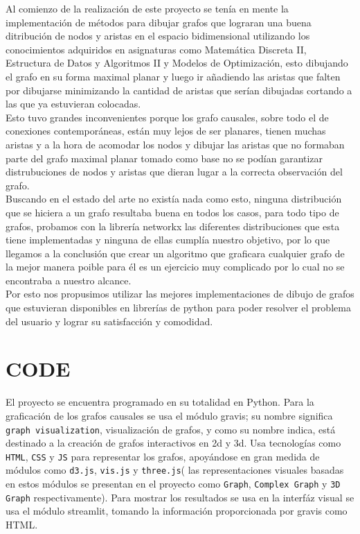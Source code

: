 \documentclass[a4paper,10pt,twocolumn]{article}
\begin{document}
Al comienzo de la realización de este proyecto se tenía en mente la implementación de métodos para dibujar grafos que lograran una buena ditribución de nodos y aristas en el espacio bidimensional utilizando los conocimientos adquiridos en asignaturas como Matemática Discreta II, Estructura de Datos y Algoritmos II y Modelos de Optimización, esto dibujando el grafo en su forma maximal planar y luego ir añadiendo las aristas que falten por dibujarse  minimizando la cantidad de aristas que serían dibujadas cortando a las que ya estuvieran colocadas. \\

Esto tuvo grandes inconvenientes porque los grafo causales, sobre todo el de conexiones contemporáneas, están muy lejos de ser planares, tienen muchas aristas y a la hora de acomodar los nodos y dibujar las aristas que no formaban parte del grafo maximal planar tomado como base no se podían garantizar distrubuciones de nodos y aristas que dieran lugar a la correcta observación del grafo.\\

Buscando en el estado del arte no existía nada como esto, ninguna distribución que se hiciera a un grafo resultaba buena en todos los casos, para todo tipo de grafos, probamos con la librería networkx las diferentes distribuciones que esta tiene implementadas y ninguna de ellas cumplía nuestro objetivo, por lo que llegamos a la conclusión que crear un algoritmo que graficara cualquier grafo de la mejor manera poible para él es un ejercicio muy complicado por lo cual no se encontraba a nuestro alcance.\\

Por esto nos propusimos utilizar las mejores implementaciones de dibujo de grafos que estuvieran disponibles en librerías de python para poder resolver el problema del usuario y lograr su satisfacción y comodidad.\\








\section*{CODE}
El proyecto se encuentra programado en su totalidad en Python. Para la graficación de los grafos causales
se usa el módulo gravis; su nombre significa \texttt{graph visualization}, visualización de grafos,
y como su nombre indica, está destinado a la creación de grafos interactivos en 2d y 3d.
Usa tecnologías como \texttt{HTML}, \texttt{CSS} y \texttt{JS} para representar los grafos, apoyándose en gran medida de
módulos como \texttt{d3.js}, \texttt{vis.js} y \texttt{three.js}( las representaciones visuales basadas en estos módulos
se presentan en el proyecto como \texttt{Graph}, \texttt{Complex Graph} y \texttt{3D Graph} respectivamente).
Para mostrar los resultados se usa en la interfáz visual se usa el módulo streamlit,
tomando la información proporcionada por gravis como HTML.\\
\end{document}
